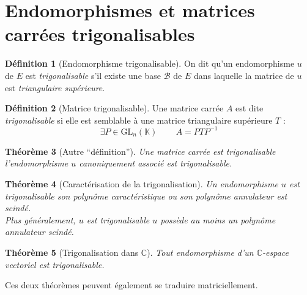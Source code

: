 \documentclass[11pt,a4paper]{report}
\newtheorem{theorem}{Théorème}[chapter]
\newtheorem{itheorem}[theorem]{Théorème}
\theoremstyle{definition}
\newtheorem{dfn}[theorem]{Définition}
\begin{document}
\section{Endomorphismes et matrices carrées trigonalisables} %
\label{sec:endomorphismes_et_matrices_carrees_trigonalisables} 
\begin{dfn}[Endomorphisme trigonalisable]
     On dit qu'un endomorphisme $u$ de $E$ est \emph{trigonalisable} s'il existe une base $\mathcal{B}$ de $E$ dans laquelle la matrice de $u$ est \emph{triangulaire supérieure}.
\end{dfn}
\begin{dfn}[Matrice trigonalisable]
     Une matrice carrée $A$ est dite \emph{trigonalisable} si elle est semblable à une matrice triangulaire supérieure $T$ : 
     \begin{equation}
      \exists P\in \mathrm{GL}_n(\mathbb{K})\, \qquad A = PTP^{-1}
      \end{equation} 
\end{dfn}
\begin{theorem}[Autre ``définition'']
     Une matrice carrée est trigonalisable \Longleftrightarrow l'endomorphisme $u$ canoniquement associé est trigonalisable.
\end{theorem}
\begin{itheorem}[Caractérisation de la trigonalisation]
     Un endomorphisme $u$ est trigonalisable \Longleftrightarrow son polynôme caractéristique ou son polynôme annulateur est scindé.\\
     Plus généralement, $u$ est trigonalisable \Longleftrightarrow $u$ possède au moins un polynôme annulateur scindé.
\end{itheorem}
\begin{theorem}[Trigonalisation dans $\ensuremath{\mathbb{C}}$]
     Tout endomorphisme d'un $\ensuremath{\mathbb{C}}$-espace vectoriel est trigonalisable.
\end{theorem}
Ces deux théorèmes peuvent également se traduire matriciellement.
\end{document}
